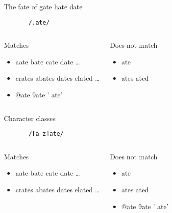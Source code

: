 \documentclass{beamer}
\begin{document}
\begin{frame}[fragile]{The fate of gate hate date}
  \begin{verbatim}
       /.ate/
  \end{verbatim}
  \begin{columns}[t]
      \begin{block}{Matches}
        \begin{itemize}
        \item aate bate cate date \ldots
        \item crates abates dates elated \ldots
        \item<2-> @ate 9ate ' ate'
        \end{itemize}
      \end{block}
      \begin{block}{Does not match}
        \begin{itemize}
        \item ate
        \item ates ated
        \end{itemize}
      \end{block}
  \end{columns}
\end{frame}


\begin{frame}[fragile]{Character classes}
  \begin{verbatim}
       /[a-z]ate/
  \end{verbatim}
  \begin{columns}[t]
      \begin{block}{Matches}
        \begin{itemize}
        \item aate bate cate date \ldots
        \item crates abates dates elated \ldots
        \end{itemize}
      \end{block}
      \begin{block}{Does not match}
        \begin{itemize}
        \item ate
        \item ates ated
        \item @ate 9ate ' ate'
        \end{itemize}
      \end{block}
  \end{columns}
\end{frame}
\end{document}
